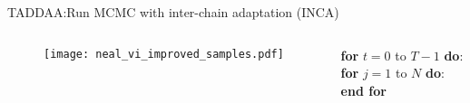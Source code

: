 \documentclass[10pt,xcolor=table]{beamer}
\begin{document}
\begin{frame}{TADDAA:Run MCMC with inter-chain adaptation (INCA)}
  \begin{columns}
  \begin{column}{0.5\linewidth}
\begin{figure}
  \begin{center}
    \texttt{[image: neal\_vi\_improved\_samples.pdf]}
  \end{center}
\end{figure}
  \end{column}
  \begin{column}{0.6 \linewidth}
        \textbf{\quad for} $t=0$ to $T-1$ \textbf{do}:\\
        \textbf{\quad\qquad for} $j=1$ to $N$ \textbf{do}:
        \\
        \textbf{\quad\qquad end for}\\
        \\
  \end{column}
  \end{columns}
\end{frame}
\end{document}

